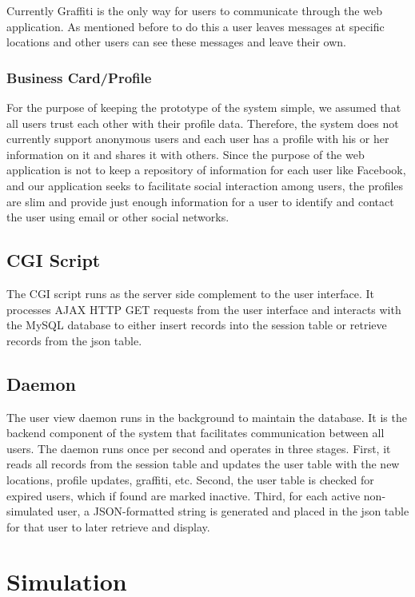 \documentclass[11pt]{article}
\begin{document}
Currently Graffiti is the only way for users to communicate through the
web application. As mentioned before to do this a user leaves messages
at specific locations and other users can see these messages and leave
their own.

\subsubsection{Business Card/Profile}

For the purpose of keeping the prototype of the system simple, we
assumed that all users trust each other with their profile data.  Therefore,
the system does not currently support anonymous users and each user has 
a profile with his or her information on it and shares it with others. 
Since the purpose of the web application is not to keep a
repository of information for each user like Facebook, and our application
seeks to facilitate social interaction among users, the profiles are
slim and provide just enough information for a user to identify and contact
the user using email or other social networks.

\subsection{CGI Script}

The CGI script runs as the server side complement to the user interface.
It processes AJAX HTTP GET requests from the user interface and interacts
with the MySQL database to either insert records into the session table
or retrieve records from the json table.

\subsection{Daemon}

The user view daemon runs in the background to maintain the database.
It is the backend component of the system that facilitates communication
between all users.  The daemon runs once per second and operates in three
stages. First, it reads all records from the session table and updates
the user table with the new locations, profile updates, graffiti,
etc. Second, the user table is checked for expired users, which if
found are marked inactive.  Third, for each active non-simulated user,
a JSON-formatted string is generated and placed in the json table for
that user to later retrieve and display.


\section{Simulation}
\end{document}
